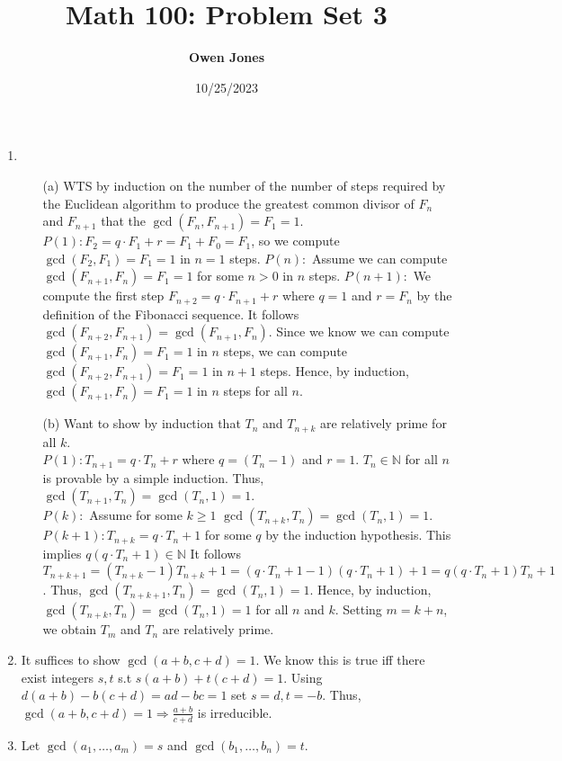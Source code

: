 \documentclass[10pt]{article}
\title{\bf Math 100: Problem Set 3}
\date{10/25/2023}
\author{\bf Owen Jones}
\begin{document}
\maketitle
\begin{enumerate}[label= (Q-\arabic*)]
    \item \begin{itemize}
        \item [(a)] WTS by induction on the number of the number of steps required by the Euclidean algorithm to produce the greatest common divisor of $F_n$ and $F_{n+1}$ that the $\gcd(F_n,F_{n+1})=F_1=1$.
        $P(1):F_2=q\cdot F_1+r=F_1+F_0=F_1$, so we compute $\gcd(F_2,F_1)=F_1=1$ in $n=1$ steps.
        $P(n):$ Assume we can compute $\gcd(F_{n+1},F_n)=F_1=1$ for some $n>0$ in $n$ steps.
        $P(n+1):$ We compute the first step $F_{n+2}=q\cdot F_{n+1}+r$ where $q=1$ and $r=F_n$ by the definition of the Fibonacci sequence. 
        It follows $\gcd(F_{n+2},F_{n+1})=\gcd(F_{n+1},F_n)$. 
        Since we know we can compute $\gcd(F_{n+1},F_n)=F_1=1$ in $n$ steps, we can compute $\gcd(F_{n+2},F_{n+1})=F_1=1$ in $n+1$ steps. 
        Hence, by induction, $\gcd(F_{n+1},F_n)=F_1=1$ in $n$ steps for all $n$.
        \item [(b)] Want to show by induction that $T_n$ and $T_{n+k}$ are relatively prime for all $k$.\\
        $P(1):T_{n+1}=q\cdot T_n+r$ where $q=(T_n-1)$ and $r=1$. 
        $T_n\in\mathbb{N}$ for all $n$ is provable by a simple induction.
        Thus, $\gcd(T_{n+1},T_n)=\gcd(T_n,1)=1$.\\
        $P(k):$ Assume for some $k\ge1$ $\gcd(T_{n+k},T_n)=\gcd(T_n,1)=1$.\\
        $P(k+1):T_{n+k}=q\cdot T_n+1$ for some $q$ by the induction hypothesis. This implies $q(q\cdot T_n+1)\in\mathbb{N}$
        It follows $T_{n+k+1}=(T_{n+k}-1)T_{n+k}+1=(q\cdot T_n+1-1)(q\cdot T_n+1)+1=q(q\cdot T_n+1)T_n+1$.
        Thus, $\gcd(T_{n+k+1},T_n)=\gcd(T_n,1)=1$.
        Hence, by induction, $\gcd(T_{n+k},T_n)=\gcd(T_n,1)=1$ for all $n$ and $k$. Setting $m=k+n$, we obtain $T_m$ and $T_n$ are relatively prime.
    \end{itemize}
    \item It suffices to show $\gcd(a+b,c+d)=1$. 
    We know this is true iff there exist integers $s,t$ s.t $s(a+b)+t(c+d)=1$. 
    Using $d(a+b)-b(c+d)=ad-bc=1$ set $s=d,t=-b$. 
    Thus, $\gcd(a+b,c+d)=1\Rightarrow \frac{a+b}{c+d}$ is irreducible.
    \item Let $\gcd(a_1,\ldots,a_m)=s$ and $\gcd(b_1,\ldots,b_n)=t$. 

\end{enumerate}
\end{document}
